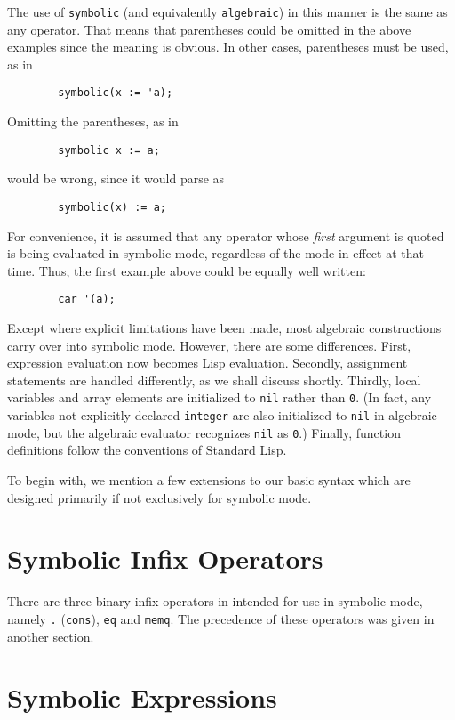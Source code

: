 The use of \texttt{symbolic} (and equivalently \texttt{algebraic}) in this
manner is the same as any operator.  That means that parentheses could be
omitted in the above examples since the meaning is obvious.  In other
cases, parentheses must be used, as in

\begin{verbatim}
        symbolic(x := 'a);
\end{verbatim}
Omitting the parentheses, as in
\begin{verbatim}
        symbolic x := a;
\end{verbatim}
would be wrong, since it would parse as
\begin{verbatim}
        symbolic(x) := a;
\end{verbatim}
For convenience, it is assumed that any operator whose \emph{first} argument is
quoted is being evaluated in symbolic mode, regardless of the mode in
effect at that time. Thus, the first example above could be equally well
written:
\begin{verbatim}
        car '(a);
\end{verbatim}
Except where explicit limitations have been made, most {\REDUCE} algebraic
constructions carry over into symbolic mode.
However, there are some differences.  First, expression evaluation now
becomes Lisp evaluation.  Secondly, assignment statements are handled
differently, as we shall discuss shortly.  Thirdly, local variables and array
elements are initialized to \texttt{nil} rather than \texttt{0}. (In fact, any
variables not explicitly declared \texttt{integer} are also initialized to
\texttt{nil} in algebraic mode, but the algebraic evaluator recognizes
\texttt{nil} as \texttt{0}.) Finally, function definitions follow the
conventions of
Standard Lisp.

To begin with, we mention a few extensions to our basic syntax which are
designed primarily if not exclusively for symbolic mode.

\section{Symbolic Infix Operators}

There are three binary infix operators in {\REDUCE} intended for use in
symbolic mode, namely \texttt{.} (\texttt{cons}), \texttt{eq} and
\texttt{memq}. The precedence of these operators was given in another section.

\section{Symbolic Expressions}

